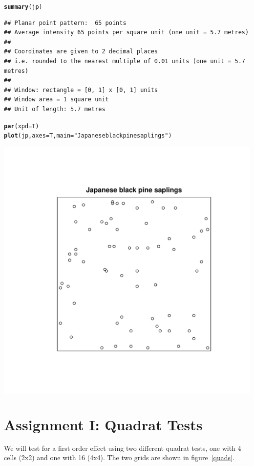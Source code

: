 \documentclass{article}\usepackage[]{graphicx}\usepackage[]{color}
\makeatletter
\def\maxwidth{ %
  \ifdim\Gin@nat@width>\linewidth
    \linewidth
  \else
    \Gin@nat@width
  \fi
}
\newcommand{\hlstr}[1]{\textcolor[rgb]{0.192,0.494,0.8}{#1}}%
\newcommand{\hlstd}[1]{\textcolor[rgb]{0.345,0.345,0.345}{#1}}%
\newcommand{\hlkwc}[1]{\textcolor[rgb]{0.333,0.667,0.333}{#1}}%
\newcommand{\hlkwd}[1]{\textcolor[rgb]{0.737,0.353,0.396}{\textbf{#1}}}%
\newenvironment{kframe}{%
 \def\at@end@of@kframe{}%
 \ifinner\ifhmode%
  \def\at@end@of@kframe{\end{minipage}}%
  \begin{minipage}{\columnwidth}%
 \fi\fi%
 \def\FrameCommand##1{\hskip\@totalleftmargin \hskip-\fboxsep
 \colorbox{shadecolor}{##1}\hskip-\fboxsep
     \hskip-\linewidth \hskip-\@totalleftmargin \hskip\columnwidth}%
 \MakeFramed {\advance\hsize-\width
   \@totalleftmargin\z@ \linewidth\hsize
   \@setminipage}}%
 {\par\unskip\endMakeFramed%
 \at@end@of@kframe}
\newenvironment{knitrout}{}{} %
\makeatother
\begin{document}
\begin{knitrout}
\color{fgcolor}\begin{kframe}
\begin{alltt}
\hlkwd{summary}\hlstd{(jp)}
\end{alltt}
\begin{verbatim}
## Planar point pattern:  65 points
## Average intensity 65 points per square unit (one unit = 5.7 metres)
## 
## Coordinates are given to 2 decimal places
## i.e. rounded to the nearest multiple of 0.01 units (one unit = 5.7 metres)
## 
## Window: rectangle = [0, 1] x [0, 1] units
## Window area = 1 square unit
## Unit of length: 5.7 metres
\end{verbatim}
\begin{alltt}
\hlkwd{par}\hlstd{(}\hlkwc{xpd}\hlstd{=T)}
\hlkwd{plot}\hlstd{(jp,}\hlkwc{axes}\hlstd{=T,} \hlkwc{main}\hlstd{=}\hlstr{"Japanese black pine saplings"}\hlstd{)}
\end{alltt}
\end{kframe}
\includegraphics[width=\maxwidth]{figure/Summarize} 

\end{knitrout}



\FloatBarrier
\section{Assignment I: Quadrat Tests}
We will test for a first order effect using two different quadrat tests, one with 4 cells (2x2) and one with 16 (4x4).  The two grids are shown in figure~\ref{quads}.\\
\end{document}
